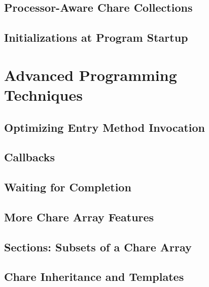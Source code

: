 \documentclass[10pt]{report}
\begin{document}
\chapter{Processor-Aware Chare Collections}
  
  

\chapter{Initializations at Program Startup}
  

\part{Advanced Programming Techniques}

\chapter{Optimizing Entry Method Invocation}
  
  
  

\chapter{Callbacks}
  

\chapter{Waiting for Completion}
  
  
  
  

\chapter{More Chare Array Features}
\label{advanced arrays}
  

\chapter{Sections: Subsets of a Chare Array}
\label{array section}
  

\chapter{Chare Inheritance and Templates}
\label{inheritance and templates}
  
\end{document}
